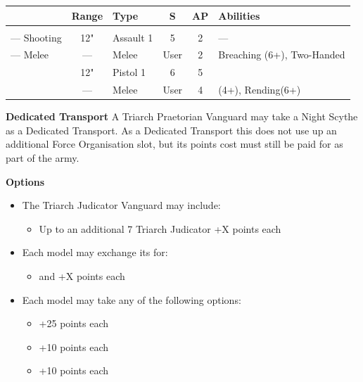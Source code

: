 \begin{minipage}[t]{0.72\textwidth}
	\begin{tabular}{L{90 pt} c C{40pt} *{2}{c} >{\raggedright\arraybackslash}p{130pt}}
		& Range & Type & S & AP & Abilities \\
		\hline
		 &  &  &  &  & \\
		— Shooting & 12" & Assault 1 & 5 & 2 & — \\
		— Melee & — & Melee & User & 2 & Breaching (6+), Two-Handed \\
		 & 12" & Pistol 1 & 6 & 5 & \\
		 & — & Melee & User & 4 &  (4+), Rending(6+) \\
	\end{tabular}
	
	\vspace*{2em}
	\textbf{Dedicated Transport}
	A Triarch Praetorian Vanguard may take a Night Scythe as a Dedicated Transport. As a Dedicated Transport this does not use up an additional Force Organisation slot, but its points cost must still be paid for as part of the army.
	
	\vspace*{2em}
	\textbf{Options}
	\begin{itemize}
		\item The Triarch Judicator Vanguard may include:
		\begin{itemize}
			\item Up to an additional 7 Triarch Judicator \dotfill +X points each
		\end{itemize}
		\item Each model may exchange its  for:
		\begin{itemize}
			\item {} and  \dotfill +X points each
		\end{itemize}
		\item Each model may take any of the following options:
		\begin{itemize}
			\item {} \dotfill +25 points each
			\item {} \dotfill +10 points each
			\item {} \dotfill +10 points each
		\end{itemize}
	\end{itemize}
\end{minipage}
\hspace{0.5em}

